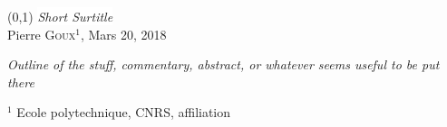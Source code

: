\begin{frame}{\underline{\small{}}}
\vspace{-.5em}
\begin{center}
\boxput*(0,1){
    \colorbox{white}{\textcolor{bleu303}{\large{\textit{Short Surtitle}}}}
}{    
\setlength{\fboxsep}{5pt}
}\\
\vspace{1.5em}
Pierre \textsc{Goux}$^1$, Mars 20, 2018 \\
\vspace{1.5em}

\textit{\small{Outline of the stuff, commentary, abstract, or whatever seems useful to be put there } }
\end{center}
\vspace{.5em}
\begin{flushright}
\footnotesize $^1$ Ecole polytechnique, CNRS, affiliation
\end{flushright}

\end{frame}
